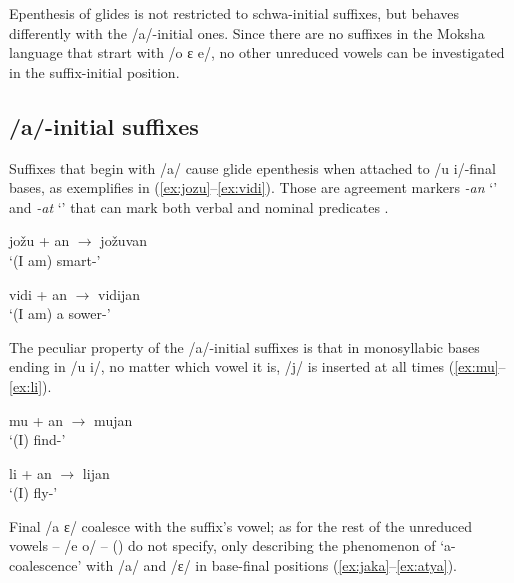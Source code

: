 \documentclass[a4paper, 12pt]{article}
\newcommand{\citeay}[2][]{\citeauthor{#2} (\citeyear[#1]{#2})}
\begin{document}
	\noindent Epenthesis of glides is not restricted to schwa-initial suffixes, but behaves differently with the /a/-initial ones. Since there are no suffixes in the Moksha language that strart with /o ɛ e/, no other unreduced vowels can be investigated in the suffix-initial position.
			
			\subsection{/a/-initial suffixes}
			
	Suffixes that begin with /a/ cause glide epenthesis when attached to /u i/-final bases, as exemplifies in (\ref{ex:jozu}--\ref{ex:vidi}). Those are agreement markers \emph{-an} `{\Fsg}' and \emph{-at} `{\Ssg}' that can mark both verbal and nominal predicates \parencite{kholodilova-np, toldova-clauses}.
	
\begin{minipage}[t]{.45\linewidth}
\ex\label{ex:jozu}
	jožu + an $\rightarrow$ jožuvan \\`(I am) smart-{\Fsg}' 
\xe
\end{minipage}
\hfill
\begin{minipage}[t]{.45\linewidth}
\ex\label{ex:vidi}
	vidi + an $\rightarrow$ vidijan \\`(I am) a sower-{\Fsg}' 
\xe
\end{minipage}	


	\noindent The peculiar property of the /a/-initial suffixes is that in monosyllabic bases ending in /u i/, no matter which vowel it is, /j/ is inserted at all times (\ref{ex:mu}--\ref{ex:li}).
	
\begin{minipage}[t]{.45\linewidth}
\ex\label{ex:mu}
	mu + an $\rightarrow$ mujan \\`(I) find-{\Fsg}' 
\xe
\end{minipage}
\hfill
\begin{minipage}[t]{.45\linewidth}
\ex\label{ex:li}
	li + an $\rightarrow$ lijan \\`(I) fly-{\Fsg}' 
\xe
\end{minipage}	

	\noindent Final /a ɛ/ coalesce with the suffix's vowel; as for the rest of the unreduced vowels -- /e o/ -- \citeay{kozlov2018} do not specify, only describing the phenomenon of `a-coalescence' with /a/ and /ɛ/ in base-final positions (\ref{ex:jaka}--\ref{ex:atya}). 
	
\end{document}
